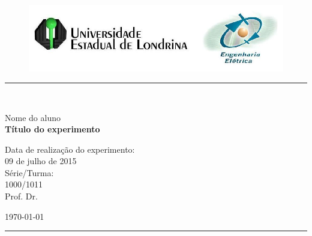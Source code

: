 \begin{titlepage}
\begin{center}
\begin{figure}[h]
\includegraphics[scale=0.76]{img/topdotitulo.png}
\end{figure}
\rule{\columnwidth}{1.5mm}
\

\large Nome do aluno\\

\vspace{4cm}
{\bf \Large Título do experimento}
\vspace{3.5cm}

\begin{flushright}
Data de realização do experimento:\\
09 de julho de 2015\\
Série/Turma:\\
1000/1011\\
Prof. Dr. 
\end{flushright}

\vspace{3.2cm}
\today

\rule{\columnwidth}{1.3mm}
\end{center}
\end{titlepage}
\blankpage